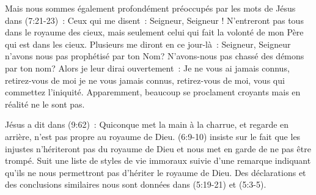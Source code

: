 \begin{enumerate}
\begin{specialpar}{}
Mais nous sommes également profondément préoccupés par les mots de Jésus dans (7:21-23)~:
 \og Ceux qui me disent~: Seigneur, Seigneur ! N'entreront pas tous dans le royaume des cieux,
 mais seulement celui qui fait la volonté de mon Père qui est dans les cieux.
 Plusieurs me diront en ce jour-là~: Seigneur, Seigneur n'avons nous pas prophétisé par  ton Nom?
 N'avons-nous pas chassé des démons par ton nom? Alors je leur dirai ouvertement~:
 Je ne vous ai jamais connus, retirez-vous de moi je ne vous jamais connus, retirez-vous de moi,
 vous qui commettez l'iniquité. \fg{}
 Apparemment, beaucoup se proclament croyants mais en réalité ne le sont pas.
\end{specialpar}

\begin{specialpar}{}
Jésus a dit dans (9:62)~: \og Quiconque met la main à la charrue,
 et regarde en arrière, n'est pas propre au royaume de Dieu. \fg{}
 \BRallowhypbch{}(6:9-10)\BRforbidhypbch{} insiste sur le fait que
 \og les injustes n'hériteront pas du royaume de Dieu \fg{}
 et nous met en garde de ne pas être trompé. 
 Suit une liste de styles de vie immoraux suivie d'une remarque
 indiquant qu'ils ne nous permettront pas d'hériter le royaume de Dieu.
 Des déclarations et des conclusions similaires nous sont données
 dans (5:19-21) et (5:3-5).
\end{specialpar}


\end{enumerate}
